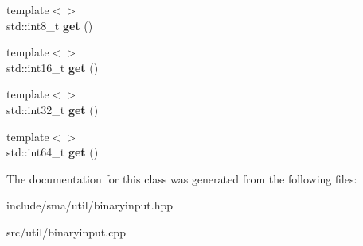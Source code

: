 \begin{DoxyCompactItemize}
\item 
\hypertarget{classsma_1_1BinaryInput_a8d14189773b657f8b95fe378aaa554fb}{{\footnotesize template$<$$>$ }\\std\-::int8\-\_\-t {\bfseries get} ()}\label{classsma_1_1BinaryInput_a8d14189773b657f8b95fe378aaa554fb}

\item 
\hypertarget{classsma_1_1BinaryInput_a99a6a795daf8bc512298187218c9a0b3}{{\footnotesize template$<$$>$ }\\std\-::int16\-\_\-t {\bfseries get} ()}\label{classsma_1_1BinaryInput_a99a6a795daf8bc512298187218c9a0b3}

\item 
\hypertarget{classsma_1_1BinaryInput_ad23c73d2c2113f4beb8e48c58f896293}{{\footnotesize template$<$$>$ }\\std\-::int32\-\_\-t {\bfseries get} ()}\label{classsma_1_1BinaryInput_ad23c73d2c2113f4beb8e48c58f896293}

\item 
\hypertarget{classsma_1_1BinaryInput_ace4718985e20551c8d530b4cb346c371}{{\footnotesize template$<$$>$ }\\std\-::int64\-\_\-t {\bfseries get} ()}\label{classsma_1_1BinaryInput_ace4718985e20551c8d530b4cb346c371}

\end{DoxyCompactItemize}


The documentation for this class was generated from the following files\-:\begin{DoxyCompactItemize}
\item 
include/sma/util/binaryinput.\-hpp\item 
src/util/binaryinput.\-cpp\end{DoxyCompactItemize}
